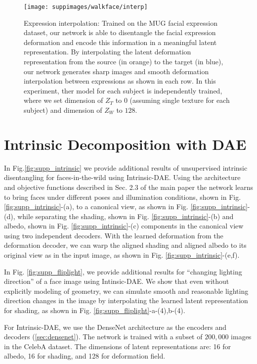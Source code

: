 \documentclass[runningheads]{llncs}
\begin{document}
\begin{figure}[ht]
	\centering
	\texttt{[image: suppimages/walkface/interp]}
	\caption{Expression interpolation: Trained on the MUG facial expression dataset, our network is able to disentangle the facial expression
deformation and encode this information in a meaningful latent representation. By interpolating the latent deformation representation
from the source (in orange) to the target (in blue), our network generates sharp images and smooth deformation interpolation between
expressions as shown in each row. In this experiment, ther model for each subject is independently trained, where we set dimension of $Z_T$ to $0$ (assuming single texture for each subject) and dimension of $Z_W$ to $128$.  }
	\label{fig:supp_interp}
\end{figure}
\FloatBarrier

\section{Intrinsic Decomposition with DAE}

In Fig.\ref{fig:supp_intrinsic} we provide additional results  of unsupervised intrinsic disentangling for faces-in-the-wild using Intrinsic-DAE. Using the architecture and objective functions described in Sec. 2.3 of the main paper the network learns to bring faces under different poses and illumination conditions, shown in Fig. \ref{fig:supp_intrinsic}-(a), to a canonical view, as shown in Fig. \ref{fig:supp_intrinsic}-(d), while separating the shading, shown in Fig. \ref{fig:supp_intrinsic}-(b) and albedo, shown in Fig. \ref{fig:supp_intrinsic}-(c) components in the canonical view using two independent decoders. With the learned deformation from the deformation decoder, we can warp the aligned shading and aligned albedo to its original view as in the input image, as shown in Fig. \ref{fig:supp_intrinsic}-(e,f). 

In Fig. \ref{fig:supp_fliplight}, we provide additional results for ``changing lighting direction'' of a face image using Intinsic-DAE. We show that even without explicitly modeling of geometry, we can simulate smooth and reasonable lighting direction changes in the image by interpolating the learned latent representation for shading, as shown in Fig. \ref{fig:supp_fliplight}-a-(4),b-(4).

For Intrinsic-DAE, we use the DenseNet architecture as the encoders and decoders (\ref{sec:densenet}). The network is trained with a subset of $200,000$ images in the CelebA dataset. The dimensions of latent representations are: 16 for albedo, 16 for shading, and 128 for deformation field.
 
\end{document}
